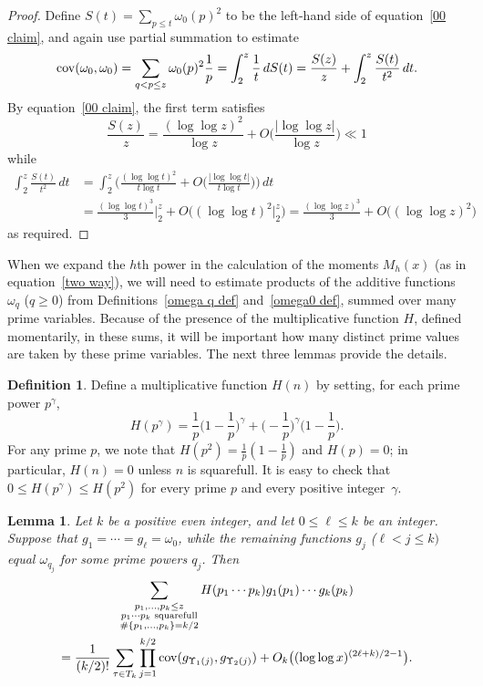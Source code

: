 \documentclass[12pt,reqno]{amsart}
\newtheorem{lemma}[theorem]{Lemma}
\theoremstyle{definition}
\newtheorem{definition}[theorem]{Definition}
\newcommand{\cov}{\mathop{\rm cov}\nolimits}
\begin{document}
\begin{proof}
Define $S(t) = \sum_{p \leq t} \omega_0(p)^2$ to be the left-hand side of equation~\eqref{00 claim}, and again use partial summation to estimate
\begin{align*}
\cov(\omega_0, \omega_{0}) = \sum_{q<p \leq z} \omega_0(p)^2 \frac{1}{p} = \int_2^z \frac{1}{t} \, dS(t) = \frac{S(z)}{z} + \int_2^z \frac{S(t)}{t^2} \, dt.
\end{align*}
By equation~\eqref{00 claim}, the first term satisfies
\[
\frac{S(z)}{z} = \frac{(\log\log z)^2}{\log z} + O\bigg(\frac{|\!\log\log z|}{\log z}\bigg) \ll 1
\]
while
\begin{align*}
\int_2^z \frac{S(t)}{t^2} \, dt &= \int_2^z \bigg( \frac{(\log\log t)^2}{t \log t} + O\bigg(\frac{|\!\log\log t|}{t \log t}\bigg) \bigg) \, dt \\
&= \frac{(\log\log t)^3}{3} \bigg|_2^z + O\big( (\log\log t)^2 \big|_2^z\big) = \frac{(\log\log z)^3}3 + O\big( (\log\log z)^2 \big)
\end{align*}
as required.
\end{proof}

When we expand the $h$th power in the calculation of the moments $M_h(x)$ (as in equation~\eqref{two way}), we will need to estimate products of the additive functions $\omega_q$ ($q\ge0$) from Definitions~\ref{omega q def} and~\ref{omega0 def}, summed over many prime variables. Because of the presence of the multiplicative function $H$, defined momentarily, in these sums, it will be important how many distinct prime values are taken by these prime variables. The next three lemmas provide the details.

\begin{definition}  \label{H def}
Define a multiplicative function $H(n)$ by setting, for each prime power $p^\gamma$,
\begin{equation*}
H(p^\gamma) = \frac{1}p \bigg( 1-\frac{1}p \bigg)^\gamma + \bigg( {-}\frac{1}p \bigg)^\gamma \bigg( 1-\frac{1}p \bigg).
\end{equation*}
For any prime $p$, we note that $H(p^2) = \frac1p(1-\frac1p)$ and $H(p)=0$; in particular, $H(n)=0$ unless $n$ is squarefull. It is easy to check that $0\le H(p^\gamma) \le H(p^2)$ for every prime $p$ and every positive integer~$\gamma$.
\end{definition}

\begin{lemma} \label{paired off lemma}
Let $k$ be a positive even integer, and let $0\le\ell\le k$ be an integer. Suppose that $g_1=\cdots=g_\ell=\omega_0$, while the remaining functions $g_j$ ($\ell<j\le k)$ equal $\omega_{q_j}$ for some prime powers $q_j$. Then
\begin{multline} \label{paired off formula}
\sum_{\substack{p_1,\dots,p_k \leq z \\ p_1\cdots p_k \text{ squarefull} \\ \#\{p_1,\dots,p_k\} = k/2}} H(p_1\cdots p_k) g_1(p_1) \cdots g_k(p_k) \\
= \frac 1{(k/2)!} \sum_{\tau\in T_k} \prod_{j=1}^{k/2} \cov(g_{\Upsilon_1(j)},g_{\Upsilon_2(j)}) + O_k\big((\log\log x)^{(2\ell + k)/2 - 1}\big).
\end{multline}
\end{lemma}
\end{document}

